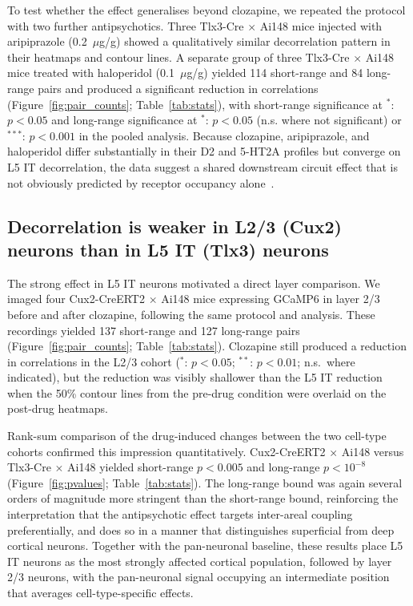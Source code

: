 \documentclass[11pt]{article}
\begin{document}
To test whether the effect generalises beyond clozapine, we repeated the protocol with two further antipsychotics. Three Tlx3-Cre $\times$ Ai148 mice injected with aripiprazole (0.2~$\mu$g/g) showed a qualitatively similar decorrelation pattern in their heatmaps and contour lines. A separate group of three Tlx3-Cre $\times$ Ai148 mice treated with haloperidol (0.1~$\mu$g/g) yielded 114 short-range and 84 long-range pairs and produced a significant reduction in correlations (Figure~\ref{fig:pair_counts}; Table~\ref{tab:stats}), with short-range significance at $^{*}$: $p<0.05$ and long-range significance at $^{*}$: $p<0.05$ (n.s. where not significant) or $^{***}$: $p<0.001$ in the pooled analysis. Because clozapine, aripiprazole, and haloperidol differ substantially in their D2 and 5-HT2A profiles but converge on L5 IT decorrelation, the data suggest a shared downstream circuit effect that is not obviously predicted by receptor occupancy alone~\citep{howes2009dopamine, kambeitz2014alterations}.

\subsection{Decorrelation is weaker in L2/3 (Cux2) neurons than in L5 IT (Tlx3) neurons}

The strong effect in L5 IT neurons motivated a direct layer comparison. We imaged four Cux2-CreERT2 $\times$ Ai148 mice expressing GCaMP6 in layer 2/3 before and after clozapine, following the same protocol and analysis. These recordings yielded 137 short-range and 127 long-range pairs (Figure~\ref{fig:pair_counts}; Table~\ref{tab:stats}). Clozapine still produced a reduction in correlations in the L2/3 cohort ($^{*}$: $p<0.05$; $^{**}$: $p<0.01$; n.s.\ where indicated), but the reduction was visibly shallower than the L5 IT reduction when the 50\% contour lines from the pre-drug condition were overlaid on the post-drug heatmaps.

Rank-sum comparison of the drug-induced changes between the two cell-type cohorts confirmed this impression quantitatively. Cux2-CreERT2 $\times$ Ai148 versus Tlx3-Cre $\times$ Ai148 yielded short-range $p<0.005$ and long-range $p<10^{-8}$ (Figure~\ref{fig:pvalues}; Table~\ref{tab:stats}). The long-range bound was again several orders of magnitude more stringent than the short-range bound, reinforcing the interpretation that the antipsychotic effect targets inter-areal coupling preferentially, and does so in a manner that distinguishes superficial from deep cortical neurons. Together with the pan-neuronal baseline, these results place L5 IT neurons as the most strongly affected cortical population, followed by layer 2/3 neurons, with the pan-neuronal signal occupying an intermediate position that averages cell-type-specific effects.
\end{document}
